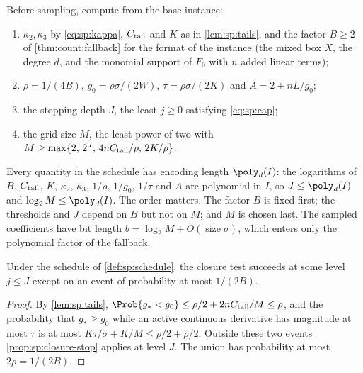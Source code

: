 \begin{definition}\label{def:sp:schedule}
Before sampling, compute from the base instance:
\begin{enumerate}[label=(\arabic*)]
\item $\kappa_2,\kappa_3$ by \eqref{eq:sp:kappa}, $C_{\rm tail}$ and $K$ as
in \cref{lem:sp:tails}, and the factor $B\ge2$ of \cref{thm:count:fallback}
for the format of the instance (the mixed box $X$, the degree $d$, and the
monomial support of $F_0$ with $n$ added linear terms);
\item $\rho=1/(4B)$, $g_0=\rho\sigma/(2W)$, $\tau=\rho\sigma/(2K)$ and
$A=2+nL/g_0$;
\item the stopping depth $J$, the least $j\ge0$ satisfying \eqref{eq:sp:cap};
\item the grid size $M$, the least power of two with
$M\ge\max\{2,\,2^J,\,4nC_{\rm tail}/\rho,\,2K/\rho\}$.
\end{enumerate}
\end{definition}

Every quantity in the schedule has encoding length $\poly_d(I)$: the
logarithms of $B$, $C_{\rm tail}$, $K$, $\kappa_2$, $\kappa_3$, $1/\rho$,
$1/g_0$, $1/\tau$ and $A$ are polynomial in $I$, so $J\le\poly_d(I)$ and
$\log_2M\le\poly_d(I)$. The order matters. The factor $B$ is fixed first;
the thresholds and $J$ depend on $B$ but not on $M$; and $M$ is chosen last.
The sampled coefficients have bit length $b=\log_2M+O(\operatorname{size}\sigma)$,
which enters only the polynomial factor of the fallback.

\begin{lemma}\label{lem:sp:rare}
Under the schedule of \cref{def:sp:schedule}, the closure test succeeds at
some level $j\le J$ except on an event of probability at most $1/(2B)$.
\end{lemma}

\begin{proof}
By \cref{lem:sp:tails},
$\Prob\{g_*<g_0\}\le\rho/2+2nC_{\rm tail}/M\le\rho$, and the probability
that $g_*\ge g_0$ while an active continuous derivative has magnitude at
most $\tau$ is at most $K\tau/\sigma+K/M\le\rho/2+\rho/2$. Outside these two
events \cref{prop:sp:closure-stop} applies at level $J$. The union has
probability at most $2\rho=1/(2B)$.
\end{proof}


